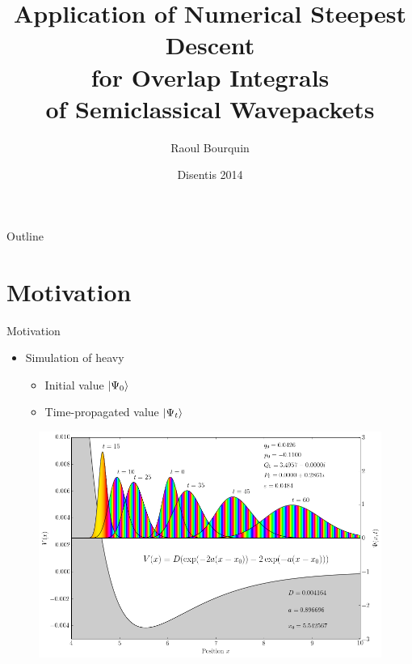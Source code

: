 \documentclass{beamer}
\title[Numerical Steepest Descent for Hagedorn Wavepackets]
      {Application of Numerical Steepest Descent \\
       for Overlap Integrals \\
       of Semiclassical Wavepackets}
\author[]{Raoul Bourquin}
\date{Disentis 2014}
\begin{document}
\begin{frame}
  \titlepage
\end{frame}

\begin{frame}{Outline}
  \tableofcontents
\end{frame}


\section{Motivation}
\begin{frame}{Motivation}
  \begin{itemize}
    \item Simulation of heavy 
    \begin{itemize}
      \item Initial value $\ket{\Psi_0}$
      \item Time-propagated value $\ket{\Psi_t}$
    \end{itemize}
  \end{itemize}
  \begin{figure}
    \centering
    \includegraphics[width=0.7\linewidth]{./fig/hg_morse_wps.png}
  \end{figure}
\end{frame}
\end{document}
